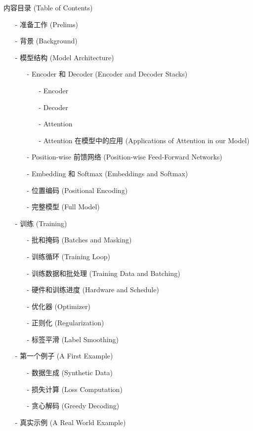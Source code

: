 内容目录 (Table of Contents)

\begin{itemize}
\item [-] 准备工作 (Prelims)
\item [-] 背景 (Background)
\item [-] 模型结构 (Model Architecture)
\begin{itemize}
\item [-] Encoder 和 Decoder (Encoder and Decoder Stacks)
\begin{itemize}
\item [-] Encoder
\item [-] Decoder
\item [-] Attention
\item [-] Attention 在模型中的应用 (Applications of Attention in our Model)
\end{itemize}
\item [-] Position-wise 前馈网络 (Position-wise Feed-Forward Networks)
\item [-] Embedding 和 Softmax (Embeddings and Softmax)
\item [-] 位置编码 (Positional Encoding)
\item [-] 完整模型 (Full Model)
\end{itemize}
\item [-] 训练 (Training)
\begin{itemize}
\item [-] 批和掩码 (Batches and Masking)
\item [-] 训练循环 (Training Loop)
\item [-] 训练数据和批处理 (Training Data and Batching)
\item [-] 硬件和训练进度 (Hardware and Schedule)
\item [-] 优化器 (Optimizer)
\item [-] 正则化 (Regularization)
\item [-] 标签平滑 (Label Smoothing)
\end{itemize}
\item [-] 第一个例子 (A First Example)
\begin{itemize}
\item [-] 数据生成 (Synthetic Data)
\item [-] 损失计算 (Loss Computation)
\item [-] 贪心解码 (Greedy Decoding)
\end{itemize}
\item [-] 真实示例 (A Real World Example)
\begin{itemize}

\end{itemize}
\end{itemize}
